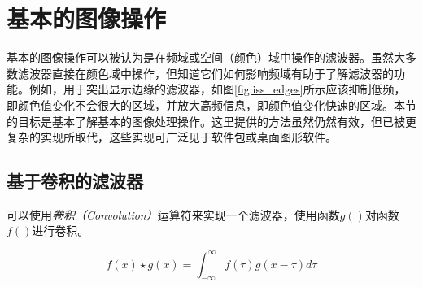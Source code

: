 
\section{基本的图像操作}
基本的图像操作可以被认为是在频域或空间（颜色）域中操作的滤波器。虽然大多数滤波器直接在颜色域中操作，但知道它们如何影响频域有助于了解滤波器的功能。例如，用于突出显示边缘的滤波器，如图\ref{fig:iss_edges}所示应该抑制低频，即颜色值变化不会很大的区域，并放大高频信息，即颜色值变化快速的区域。本节的目标是基本了解基本的图像处理操作。这里提供的方法虽然仍然有效，但已被更复杂的实现所取代，这些实现可广泛见于软件包或桌面图形软件。



\subsection{基于卷积的滤波器}
可以使用\emph{卷积（Convolution）}运算符来实现一个滤波器，使用函数$g()$对函数$f()$进行卷积。

\begin{equation}
f(x)\star g(x)=\int_{-\infty}^{\infty}f(\tau)g(x-\tau)d\tau
\end{equation}

